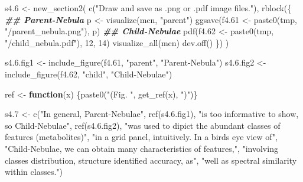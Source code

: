 \documentclass[
]{article}
\newenvironment{Shaded}{\begin{snugshade}}{\end{snugshade}}
\newcommand{\ControlFlowTok}[1]{\textcolor[rgb]{0.13,0.29,0.53}{\textbf{#1}}}
\newcommand{\DecValTok}[1]{\textcolor[rgb]{0.00,0.00,0.81}{#1}}
\newcommand{\DocumentationTok}[1]{\textcolor[rgb]{0.56,0.35,0.01}{\textbf{\textit{#1}}}}
\newcommand{\FloatTok}[1]{\textcolor[rgb]{0.00,0.00,0.81}{#1}}
\newcommand{\FunctionTok}[1]{\textcolor[rgb]{0.00,0.00,0.00}{#1}}
\newcommand{\NormalTok}[1]{#1}
\newcommand{\OtherTok}[1]{\textcolor[rgb]{0.56,0.35,0.01}{#1}}
\newcommand{\StringTok}[1]{\textcolor[rgb]{0.31,0.60,0.02}{#1}}
\begin{document}
\begin{Shaded}
\begin{Highlighting}[]
\NormalTok{s4}\FloatTok{.6} \OtherTok{\textless{}{-}} \FunctionTok{new\_section2}\NormalTok{(}
  \FunctionTok{c}\NormalTok{(}\StringTok{"Draw and save as .png or .pdf image files."}\NormalTok{),}
  \FunctionTok{rblock}\NormalTok{(\{}
    \DocumentationTok{\#\# Parent{-}Nebula}
\NormalTok{    p }\OtherTok{\textless{}{-}} \FunctionTok{visualize}\NormalTok{(mcn, }\StringTok{"parent"}\NormalTok{)}
    \FunctionTok{ggsave}\NormalTok{(f4}\FloatTok{.61} \OtherTok{\textless{}{-}} \FunctionTok{paste0}\NormalTok{(tmp, }\StringTok{"/parent\_nebula.png"}\NormalTok{), p)}
    \DocumentationTok{\#\# Child{-}Nebulae}
    \FunctionTok{pdf}\NormalTok{(f4}\FloatTok{.62} \OtherTok{\textless{}{-}} \FunctionTok{paste0}\NormalTok{(tmp, }\StringTok{"/child\_nebula.pdf"}\NormalTok{), }\DecValTok{12}\NormalTok{, }\DecValTok{14}\NormalTok{)}
    \FunctionTok{visualize\_all}\NormalTok{(mcn)}
    \FunctionTok{dev.off}\NormalTok{()}
\NormalTok{  \})}
\NormalTok{)}

\NormalTok{s4.}\FloatTok{6.}\NormalTok{fig1 }\OtherTok{\textless{}{-}} \FunctionTok{include\_figure}\NormalTok{(f4}\FloatTok{.61}\NormalTok{, }\StringTok{"parent"}\NormalTok{, }\StringTok{"Parent{-}Nebula"}\NormalTok{)}
\NormalTok{s4.}\FloatTok{6.}\NormalTok{fig2 }\OtherTok{\textless{}{-}} \FunctionTok{include\_figure}\NormalTok{(f4}\FloatTok{.62}\NormalTok{, }\StringTok{"child"}\NormalTok{, }\StringTok{"Child{-}Nebulae"}\NormalTok{)}

\NormalTok{ref }\OtherTok{\textless{}{-}} \ControlFlowTok{function}\NormalTok{(x) \{}\FunctionTok{paste0}\NormalTok{(}\StringTok{"(Fig. "}\NormalTok{, }\FunctionTok{get\_ref}\NormalTok{(x), }\StringTok{")"}\NormalTok{)\}}

\NormalTok{s4}\FloatTok{.7} \OtherTok{\textless{}{-}} \FunctionTok{c}\NormalTok{(}\StringTok{"In general, Parent{-}Nebulae"}\NormalTok{, }\FunctionTok{ref}\NormalTok{(s4.}\FloatTok{6.}\NormalTok{fig1),}
          \StringTok{"is too informative to show, so Child{-}Nebulae"}\NormalTok{, }\FunctionTok{ref}\NormalTok{(s4.}\FloatTok{6.}\NormalTok{fig2),}
          \StringTok{"was used to dipict the abundant classes of features (metabolites)"}\NormalTok{,}
          \StringTok{"in a grid panel, intuitively. In a bird\textquotesingle{}s eye view of"}\NormalTok{,}
          \StringTok{"Child{-}Nebulae, we can obtain many characteristics of features,"}\NormalTok{,}
          \StringTok{"involving classes distribution, structure identified accuracy, as"}\NormalTok{,}
          \StringTok{"well as spectral similarity within classes."}\NormalTok{)}


\end{Highlighting}
\end{Shaded}
\end{document}
